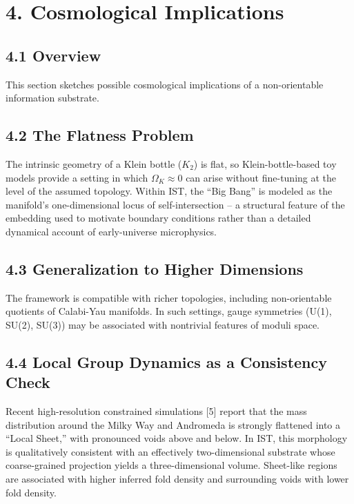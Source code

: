 \documentclass[
  11pt,
]{article}
\begin{document}
\section{4. Cosmological Implications}\label{cosmological-implications}

\subsection{4.1 Overview}\label{overview-1}

This section sketches possible cosmological implications of a
non-orientable information substrate.

\subsection{4.2 The Flatness Problem}\label{the-flatness-problem}

The intrinsic geometry of a Klein bottle (\(K_2\)) is flat, so
Klein-bottle-based toy models provide a setting in which
\(\Omega_K \approx 0\) can arise without fine-tuning at the level of the
assumed topology. Within IST, the ``Big Bang'' is modeled as the
manifold's one-dimensional locus of self-intersection -- a structural
feature of the embedding used to motivate boundary conditions rather
than a detailed dynamical account of early-universe microphysics.

\subsection{4.3 Generalization to Higher
Dimensions}\label{generalization-to-higher-dimensions}

The framework is compatible with richer topologies, including
non-orientable quotients of Calabi-Yau manifolds. In such settings,
gauge symmetries (U(1), SU(2), SU(3)) may be associated with nontrivial
features of moduli space.

\subsection{4.4 Local Group Dynamics as a Consistency
Check}\label{local-group-dynamics-as-a-consistency-check}

Recent high-resolution constrained simulations {[}5{]} report that the
mass distribution around the Milky Way and Andromeda is strongly
flattened into a ``Local Sheet,'' with pronounced voids above and below.
In IST, this morphology is qualitatively consistent with an effectively
two-dimensional substrate whose coarse-grained projection yields a
three-dimensional volume. Sheet-like regions are associated with higher
inferred fold density and surrounding voids with lower fold density.
\end{document}
